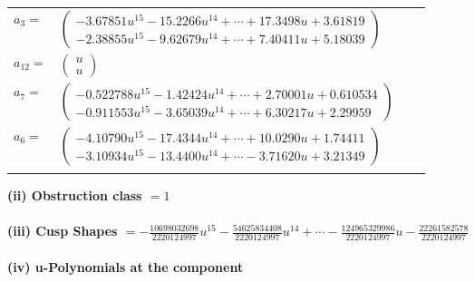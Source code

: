 \documentclass[1p]{elsarticle_modified}
\theoremstyle{definition}
\begin{document}
\begin{tabular}{m{7pt} m{180pt} m{7pt} m{180pt} }
\flushright $a_{3}=$&$\begin{pmatrix}-3.67851 u^{15}-15.2266 u^{14}+\cdots+17.3498 u+3.61819\\-2.38855 u^{15}-9.62679 u^{14}+\cdots+7.40411 u+5.18039\end{pmatrix}$ \\
\flushright $a_{12}=$&$\begin{pmatrix}u\\u\end{pmatrix}$ \\
\flushright $a_{7}=$&$\begin{pmatrix}-0.522788 u^{15}-1.42424 u^{14}+\cdots+2.70001 u+0.610534\\-0.911553 u^{15}-3.65039 u^{14}+\cdots+6.30217 u+2.29959\end{pmatrix}$ \\
\flushright $a_{6}=$&$\begin{pmatrix}-4.10790 u^{15}-17.4344 u^{14}+\cdots+10.0290 u+1.74411\\-3.10934 u^{15}-13.4400 u^{14}+\cdots-3.71620 u+3.21349\end{pmatrix}$\\&\end{tabular}
\flushleft \textbf{(ii) Obstruction class $= 1$}\\~\\
\flushleft \textbf{(iii) Cusp Shapes $= -\frac{10698032698}{2220124997} u^{15}-\frac{54625834408}{2220124997} u^{14}+\cdots-\frac{124965329986}{2220124997} u-\frac{22261582578}{2220124997}$}\\~\\
\newpage\renewcommand{\arraystretch}{1}
\flushleft \textbf{(iv) u-Polynomials at the component}\newline \\
\end{document}
